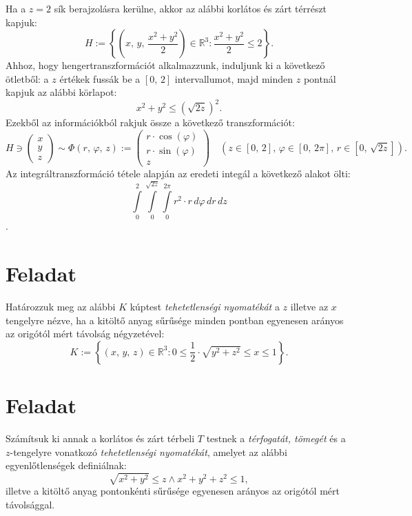 \documentclass[12pt]{article}
\newcommand{\R}{\mathbb{R}}
\begin{document}
    Ha a $z = 2$ sík berajzolásra kerülne, akkor az alábbi korlátos és zárt térrészt kapjuk:
    \[
        H := \left\{ \left(x, \, y, \, \frac{x^2 + y^2}{2} \right) \in \R^3 : \frac{x^2 + y^2}{2} \leq 2 \right\}.
    \]
    Ahhoz, hogy hengertranszformációt alkalmazzunk, induljunk ki a következő ötletből: a $z$ értékek fussák be a $[0, \, 2]$ intervallumot, majd minden $z$ pontnál kapjuk az alábbi körlapot:
    \[
        x^2 + y^2 \leq \left( \sqrt{2z} \right)^2.
    \]
    Ezekből az információkból rakjuk össze a következő transzformációt:
    \[
        H \ni    
        \begin{pmatrix}
            x \\
            y \\
            z
        \end{pmatrix}
        \sim
        \Phi(r, \, \varphi, \, z) :=
        \begin{pmatrix}
            r \cdot \cos(\varphi) \\
            r \cdot \sin(\varphi) \\
            z
        \end{pmatrix}
        \quad \left(z \in [0, \, 2], \, \varphi \in [0, \, 2\pi], \, r \in [0, \, \sqrt{2z}]\right).
    \]
    Az integráltranszformáció tétele alapján az eredeti integál a következő alakot ölti:
    \[
        \int\limits_0^2 \int\limits_0^{\sqrt{2z}} \int\limits_0^{2\pi} r^2 \cdot r \, d\varphi \, dr \, dz
    \].

    \newpage
    \section{Feladat}
    Határozzuk meg az alábbi $K$ kúptest \textit{tehetetlenségi nyomatékát} a $z$ illetve az $x$ tengelyre nézve, ha a kitöltő anyag sűrűsége minden pontban egyenesen arányos az origótól mért távolság négyzetével:
    \[
        K := \left\{ (x, \, y, \, z) \in \R^3 : 0 \leq \frac{1}{2} \cdot \sqrt{y^2 + z^2} \leq x \leq 1 \right\}.
    \]
    
    \newpage
    \section{Feladat}
    Számítsuk ki annak a korlátos és zárt térbeli $T$ testnek a \textit{térfogatát, tömegét} és a $z$-tengelyre vonatkozó \textit{tehetetlenségi nyomatékát}, amelyet az alábbi egyenlőtlenségek definiálnak:
    \[
        \sqrt{x^2 + y^2} \leq z \wedge x^2 + y^2 + z^2 \leq 1,
    \]
    illetve a kitöltő anyag pontonkénti sűrűsége egyenesen arányos az origótól mért távolsággal.
\end{document}
